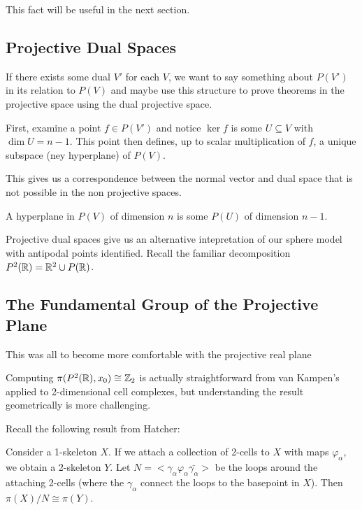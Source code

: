 \documentclass[10pt]{article}
\begin{document}
This fact will be useful in the next section.

\subsection{Projective Dual Spaces}

If there exists some dual $V'$ for each $V$, we want to say something about
$P(V')$ in its relation to $P(V)$ and maybe use this structure to prove
theorems in the projective space using the dual projective space. 

First, examine a point $f \in P(V')$ and notice $\ker f$ is some $U \subseteq
V$ with $\dim U = n-1$. This point then defines, up to scalar multiplication of
$f$, a unique subspace (ney hyperplane) of $P(V)$.

This gives us a correspondence between the normal vector and dual space that is
not possible in the non projective spaces.

\begin{definition}
	A hyperplane in $P(V)$ of dimension $n$ is some $P(U)$ of dimension $n-1$.
\end{definition}

Projective dual spaces give us an alternative intepretation of our sphere model
with antipodal points identified. Recall the familiar decomposition $P^2(\mathbb{R}) =
\mathbb{R}^2 \cup P(\mathbb{R})$.


\subsection{The Fundamental Group of the Projective Plane}

This was all to become more comfortable with the projective real plane 

Computing $\pi(P^2(\mathbb{R}), x_0) \cong \mathbb{Z}_2$ is actually straightforward from van
Kampen's applied to 2-dimensional cell complexes, but understanding the result
geometrically is more challenging.

Recall the following result from Hatcher:

\begin{theorem}
	Consider a 1-skeleton $X$. If we attach a collection of 2-cells to $X$ with
	maps $\varphi_{\alpha}$, we obtain a 2-skeleton $Y$. Let $N = <
\gamma_{\alpha} \varphi_{\alpha} \bar{\gamma_{\alpha}} >$ be the loops around
the attaching 2-cells (where the $\gamma_{\alpha}$ connect the loops to the
basepoint in $X$). Then $\pi(X) / N \cong \pi(Y)$.
\end{theorem}
\end{document}
